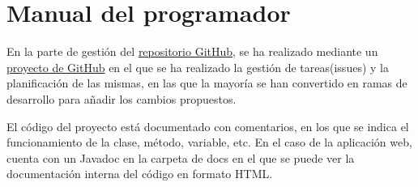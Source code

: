 \section{Manual del programador}
\label{sec:manual-programador}

En la parte de gestión del \href{https://github.com/CesarRodrigu/GII-24.19-contramedidas-IoT-mediante-reinforcement-learning}{repositorio GitHub}, se ha realizado mediante un \href{https://github.com/users/CesarRodrigu/projects/6}{proyecto de GitHub} en el que se ha realizado la gestión de tareas(issues) y la planificación de las mismas, en las que la mayoría se han convertido en ramas de desarrollo para añadir los cambios propuestos.

El código del proyecto está documentado con comentarios, en los que se indica el funcionamiento de la clase, método, variable, etc. En el caso de la aplicación web, cuenta con un Javadoc en la carpeta de docs en el que se puede ver la documentación interna del código en formato HTML.

